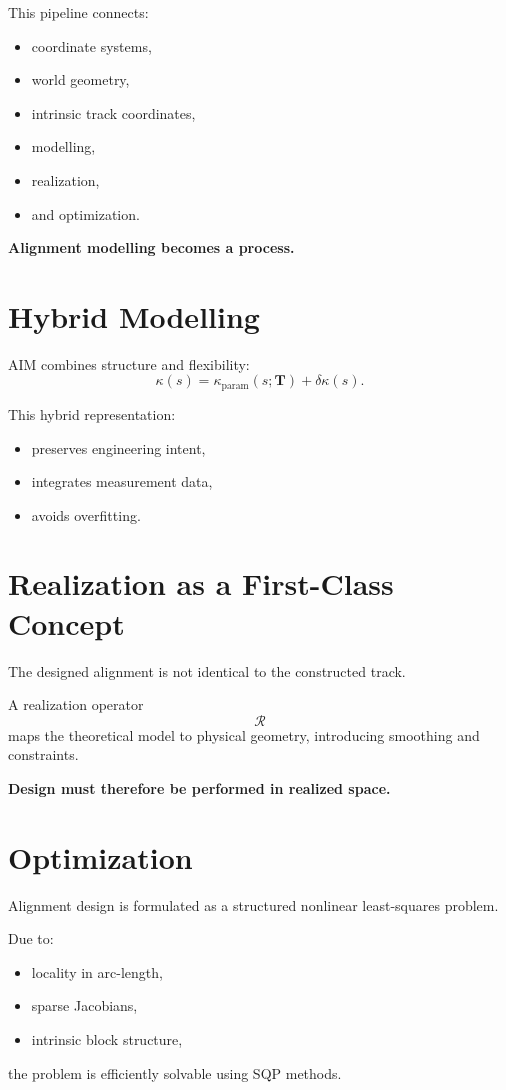 This pipeline connects:
\begin{itemize}
\item coordinate systems,
\item world geometry,
\item intrinsic track coordinates,
\item modelling,
\item realization,
\item and optimization.
\end{itemize}

\textbf{Alignment modelling becomes a process.}


\section*{Hybrid Modelling}

AIM combines structure and flexibility:
\[
\kappa(s)
=
\kappa_{\mathrm{param}}(s;\mathbf{T})
+
\delta\kappa(s).
\]

This hybrid representation:
\begin{itemize}
\item preserves engineering intent,
\item integrates measurement data,
\item avoids overfitting.
\end{itemize}


\section*{Realization as a First-Class Concept}

The designed alignment is not identical to the constructed track.

A realization operator
\[
\mathcal{R}
\]
maps the theoretical model to physical geometry, introducing smoothing
and constraints.

\textbf{Design must therefore be performed in realized space.}


\section*{Optimization}

Alignment design is formulated as a structured nonlinear least-squares
problem.

Due to:
\begin{itemize}
\item locality in arc-length,
\item sparse Jacobians,
\item intrinsic block structure,
\end{itemize}
the problem is efficiently solvable using SQP methods.


